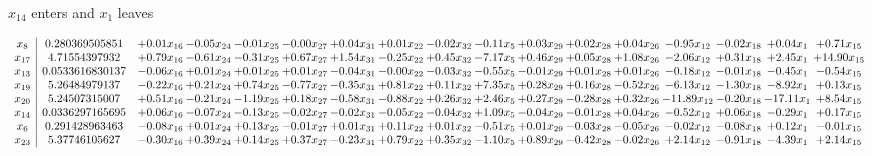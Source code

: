 \documentclass[9pt]{article}
\begin{document}
 $ x_{14} $ enters and $ x_{1} $ leaves 

 \[\begin{array}{c| c c@{\hskip 2pt} c@{\hskip 2pt} c@{\hskip 2pt} c@{\hskip 2pt} c@{\hskip 2pt} c@{\hskip 2pt} c@{\hskip 2pt} c@{\hskip 2pt} c@{\hskip 2pt} c@{\hskip 2pt} c@{\hskip 2pt} c@{\hskip 2pt} c@{\hskip 2pt} c@{\hskip 2pt} c@{\hskip 2pt} }
 x_{8}   &  0.280369505851 & +  0.01 x_{16} & -0.05 x_{24} & -0.01 x_{25} & -0.00 x_{27} & +  0.04 x_{31} & +  0.01 x_{22} & -0.02 x_{32} & -0.11 x_{5} & +  0.03 x_{29} & +  0.02 x_{28} & +  0.04 x_{26} & -0.95 x_{12} & -0.02 x_{18} & +  0.04 x_{1} & +  0.71 x_{15}\\
 x_{17}   &  4.71554397932 & +  0.79 x_{16} & -0.61 x_{24} & -0.31 x_{25} & +  0.67 x_{27} & +  1.54 x_{31} & -0.25 x_{22} & +  0.45 x_{32} & -7.17 x_{5} & +  0.46 x_{29} & +  0.05 x_{28} & +  1.08 x_{26} & -2.06 x_{12} & +  0.31 x_{18} & +  2.45 x_{1} & + 14.90 x_{15}\\
 x_{13}   &  0.0533616830137 & -0.06 x_{16} & +  0.01 x_{24} & +  0.01 x_{25} & +  0.01 x_{27} & -0.04 x_{31} & -0.00 x_{22} & -0.03 x_{32} & -0.55 x_{5} & -0.01 x_{29} & +  0.01 x_{28} & +  0.01 x_{26} & -0.18 x_{12} & -0.01 x_{18} & -0.45 x_{1} & -0.54 x_{15}\\
 x_{19}   &  5.26484979137 & -0.22 x_{16} & +  0.21 x_{24} & +  0.74 x_{25} & -0.77 x_{27} & -0.35 x_{31} & +  0.81 x_{22} & +  0.11 x_{32} & +  7.35 x_{5} & +  0.28 x_{29} & +  0.16 x_{28} & -0.52 x_{26} & -6.13 x_{12} & -1.30 x_{18} & -8.92 x_{1} & +  0.13 x_{15}\\
 x_{20}   &  5.24507315007 & +  0.51 x_{16} & -0.21 x_{24} & -1.19 x_{25} & +  0.18 x_{27} & -0.58 x_{31} & -0.88 x_{22} & +  0.26 x_{32} & +  2.46 x_{5} & +  0.27 x_{29} & -0.28 x_{28} & +  0.32 x_{26} & -11.89 x_{12} & -0.20 x_{18} & -17.11 x_{1} & +  8.54 x_{15}\\
 x_{14}   &  0.0336297165695 & +  0.06 x_{16} & -0.07 x_{24} & -0.13 x_{25} & -0.02 x_{27} & -0.02 x_{31} & -0.05 x_{22} & -0.04 x_{32} & +  1.09 x_{5} & -0.04 x_{29} & -0.01 x_{28} & +  0.04 x_{26} & -0.52 x_{12} & +  0.06 x_{18} & -0.29 x_{1} & +  0.17 x_{15}\\
 x_{6}   &  0.291428963463 & -0.08 x_{16} & +  0.01 x_{24} & +  0.13 x_{25} & -0.01 x_{27} & +  0.01 x_{31} & +  0.11 x_{22} & +  0.01 x_{32} & -0.51 x_{5} & +  0.01 x_{29} & -0.03 x_{28} & -0.05 x_{26} & -0.02 x_{12} & -0.08 x_{18} & +  0.12 x_{1} & -0.01 x_{15}\\
 x_{23}   &  5.37746105627 & -0.30 x_{16} & +  0.39 x_{24} & +  0.14 x_{25} & +  0.37 x_{27} & -0.23 x_{31} & +  0.79 x_{22} & +  0.35 x_{32} & -1.10 x_{5} & +  0.89 x_{29} & -0.42 x_{28} & -0.02 x_{26} & +  2.14 x_{12} & -0.91 x_{18} & -4.39 x_{1} & +  2.14 x_{15}\\

\end{array}\]
\end{document}
